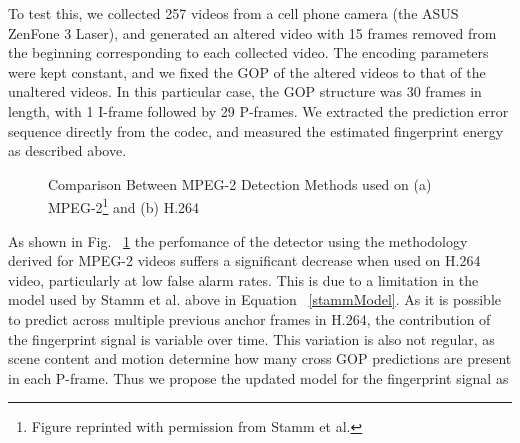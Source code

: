 To test this, we collected 257 videos from a cell phone camera (the ASUS ZenFone 3 Laser), and generated an altered video with 15 frames removed from the beginning corresponding to each collected video. The encoding parameters were kept constant, and we fixed the GOP of the altered videos to that of the unaltered videos. In this particular case, the GOP structure was 30 frames in length, with 1 I-frame followed by 29 P-frames. We extracted the prediction error sequence directly from the codec, and measured the estimated fingerprint energy as described above.

\begin{figure}[tbp]%
  \centering
  \qquad
\caption[Comparison Between MPEG-2 Detection Methods used on (a) MPEG-2 and (b) H.264]{Comparison Between MPEG-2 Detection Methods used on (a) MPEG-2\footnote{Figure reprinted with permission from Stamm et al.} and (b) H.264}%
\label{oldMethodCompare}%
\end{figure}


As shown in Fig. ~\ref{oldMethodCompare} the perfomance of the detector using the methodology derived for MPEG-2 videos suffers a significant decrease when used on H.264 video, particularly at low false alarm rates. This is due to a limitation in the model used by Stamm et al. above in Equation ~\ref{stammModel}. As it is possible to predict across multiple previous anchor frames in H.264, the contribution of the fingerprint signal is variable over time. This variation is also not regular, as scene content and motion determine how many cross GOP predictions are present in each P-frame. Thus we propose the updated model for the fingerprint signal as

